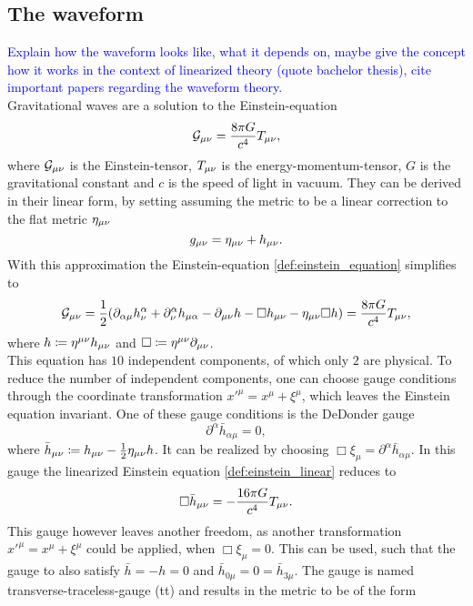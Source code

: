 \subsection{The waveform}
\textcolor{blue}{Explain how the waveform looks like, what it depends on, maybe give the concept how it works in the context of linearized theory (quote bachelor thesis), cite important papers regarding the waveform theory.}\\
Gravitational waves are a solution to the Einstein-equation
\begin{equation}\label{def:einstein_equation}
\mathcal{G}_{\mu\nu} = \frac{8\pi G}{c^4}T_{\mu\nu},
\end{equation}
where $\mathcal{G}_{\mu\nu}$ is the Einstein-tensor, $T_{\mu\nu}$ is the energy-momentum-tensor, $G$ is the gravitational constant and $c$ is the speed of light in vacuum. They can be derived in their linear form, by setting assuming the metric to be a linear correction to the flat metric $\eta_{\mu\nu}$
\begin{equation}
g_{\mu\nu} = \eta_{\mu\nu} + h_{\mu\nu}.
\end{equation}
With this approximation the Einstein-equation \eqref{def:einstein_equation} simplifies to
\begin{equation}\label{def:einstein_linear}
\mathcal{G}_{\mu\nu}=\frac{1}{2}{\left( \partial_{\alpha\mu}h^\alpha_\nu+\partial^\alpha_\nu h_{\mu\alpha} - \partial_{\mu\nu} h- \Box h_{\mu\nu} - \eta_{\mu\nu}\Box h \right)} = \frac{8\pi G}{c^4}T_{\mu\nu},
\end{equation}
where $h\coloneqq\eta^{\mu\nu} h_{\mu\nu}$ and $\Box\coloneqq\eta^{\mu\nu}\partial_{\mu\nu}$.\\
This equation has $10$ independent components, of which only $2$ are physical. To reduce the number of independent components, one can choose gauge conditions through the coordinate transformation ${x'}^\mu=x^\mu+\xi^\mu$, which leaves the Einstein equation invariant. One of these gauge conditions is the DeDonder gauge
\begin{equation}
\partial^\alpha \bar{h}_{\alpha\mu} = 0,
\end{equation}
where $\bar{h}_{\mu\nu}\coloneqq h_{\mu\nu} - \frac{1}{2}\eta_{\mu\nu} h$. It can be realized by choosing $\Box\xi_\mu =\partial^\alpha \bar{h}_{\alpha\mu}$. In this gauge the linearized Einstein equation \eqref{def:einstein_linear} reduces to
\begin{equation}\label{def:gw_equation}
\Box\bar{h}_{\mu\nu}=-\frac{16\pi G}{c^4}T_{\mu\nu}.
\end{equation}
This gauge however leaves another freedom, as another transformation ${x'}^\mu=x^\mu+\xi^\mu$ could be applied, when $\Box\xi_\mu =0$. This can be used, such that the gauge to also satisfy $\bar{h}=-h=0$ and $\bar{h}_{0\mu} = 0 = \bar{h}_{3\mu}$. The gauge is named transverse-traceless-gauge (\gls{tt}) and results in the metric to be of the form
